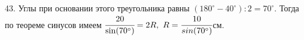 43. Углы при основании этого треугольника равны $(180^\circ-40^\circ):2=70^\circ.$ Тогда по теореме синусов имеем $\cfrac{20}{\sin(70^\circ)}=2R,\ R=\cfrac{10}{sin(70^\circ)}$см.\\
